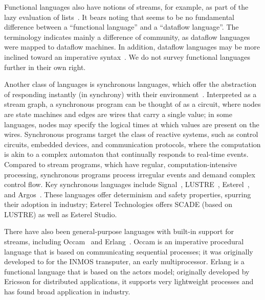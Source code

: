 Functional languages also have notions of streams, for example, as
part of the lazy evaluation of lists~\cite{henderson_lazy_1976}.  It
bears noting that seems to be no fundamental difference between a
``functional language'' and a ``dataflow language''.  The terminology
indicates mainly a difference of community, as dataflow languages were
mapped to dataflow machines.  In addition, dataflow languages may be
more inclined toward an imperative
syntax~\cite{johnston_advances_2004}.  We do not survey functional
languages further in their own right.

Another class of languages is synchronous languages, which offer the
abstraction of responding instantly (in synchrony) with their
environment~\cite{halbwachs_synchronous_1998}.  Interpreted as a
stream graph, a synchronous program can be thought of as a circuit,
where nodes are state machines and edges are wires that carry a single
value; in some languages, nodes may specify the logical times at which
values are present on the wires.  Synchronous programs target the
class of reactive systems, such as control circuits, embedded devices,
and communication protocols, where the computation is akin to a
complex automaton that continually responds to real-time events.
Compared to stream programs, which have regular, computation-intensive
processing, synchronous programs process irregular events and demand
complex control flow.  Key synchronous languages include
Signal~\cite{le_guernic_signal--data_1986},
LUSTRE~\cite{caspi_lustre:declarative_1987,halbwachs_synchronous_1991},
Esterel~\cite{berry_esterel_1992}, and
Argos~\cite{maraninchi_argos:automaton-based_2001}.  These languages offer
determinism and safety properties, spurring their adoption in
industry; Esterel Technologies offers SCADE (based on LUSTRE) as well
as Esterel Studio.

There have also been general-purpose languages with built-in support
for streams, including Occam~\cite{occammanual} and
Erlang~\cite{armstrong_concurrent_1993,armstrong_history_2007}.  Occam
is an imperative procedural language that is based on communicating
sequential processes; it was originally developed to for the INMOS
transputer, an early multiprocessor.  Erlang is a functional language
that is based on the actors model; originally developed by Ericsson
for distributed applications, it supports very lightweight processes
and has found broad application in industry.


